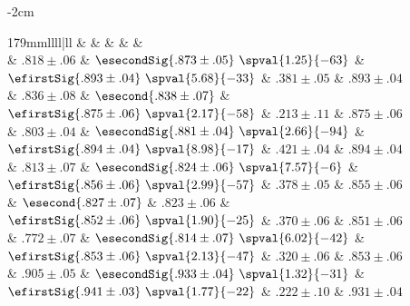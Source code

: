 \begin{table*}[htb]
\begin{adjustwidth}{-2cm}{}
  \centering
  \small
  \caption[Performance of our proposed methods on synthetic instances]{Standardized AMI of 5
    methods, when generating directions with 7 configurations. For each
    configuration, we generate directions 200 times, and report the mean standardized AMI along with
    the standard deviation. Among the first three methods (that do not use matrix formulation), we
    highlight the best one in \textbf{\textcolor{brown}{bold brown}} and the second best one in
    \textit{\textcolor{red}{italic red}}. When the difference between a score and the next best one
    is statistically significant (\ie{} when we can confidently reject the hypothesis that the two
    distributions have the same mean), we furthermore show in parenthesis the supporting
    $p$-value of a paired Student's $t$-test.
  \label{tab:edge_Wvaries_nami}}
  \begin{tabulary}{179mm}{llll|ll}
    \toprule
     &         \thead{\kmeans{}} &                                  \thead{\lloyd{}} &                              \thead{\combined{}} &  \thead{\fwa{}} &  \thead{\pqt{}} \\
    \midrule
    {} &            $.818 \pm .06$ &  $\esecondSig{.873 \pm .05}\,\,\spval{1.25}{-63}$ &  $\efirstSig{.893 \pm .04}\,\,\spval{5.68}{-33}$ &  $.381 \pm .05$ &  $.893 \pm .04$ \\
    {\smallk{}}  &            $.836 \pm .08$ &                          $\esecond{.838 \pm .07}$ &  $\efirstSig{.875 \pm .06}\,\,\spval{2.17}{-58}$ &  $.213 \pm .11$ &  $.875 \pm .06$ \\
    {\largek{}}  &            $.803 \pm .04$ &  $\esecondSig{.881 \pm .04}\,\,\spval{2.66}{-94}$ &  $\efirstSig{.894 \pm .04}\,\,\spval{8.98}{-17}$ &  $.421 \pm .04$ &  $.894 \pm .04$ \\
    {\smallo{}}  &            $.813 \pm .07$ &   $\esecondSig{.824 \pm .06}\,\,\spval{7.57}{-6}$ &  $\efirstSig{.856 \pm .06}\,\,\spval{2.99}{-57}$ &  $.378 \pm .05$ &  $.855 \pm .06$ \\
    {\largeo{}}  &  $\esecond{.827 \pm .07}$ &                                    $.823 \pm .06$ &  $\efirstSig{.852 \pm .06}\,\,\spval{1.90}{-25}$ &  $.370 \pm .06$ &  $.851 \pm .06$ \\
    {\fdirs{}}   &            $.772 \pm .07$ &  $\esecondSig{.814 \pm .07}\,\,\spval{6.02}{-42}$ &  $\efirstSig{.853 \pm .06}\,\,\spval{2.13}{-47}$ &  $.320 \pm .06$ &  $.853 \pm .06$ \\
    {\larged{}}  &            $.905 \pm .05$ &  $\esecondSig{.933 \pm .04}\,\,\spval{1.32}{-31}$ &  $\efirstSig{.941 \pm .03}\,\,\spval{1.77}{-22}$ &  $.222 \pm .10$ &  $.931 \pm .04$ \\
    \bottomrule
  \end{tabulary}
\end{adjustwidth}
\end{table*}

